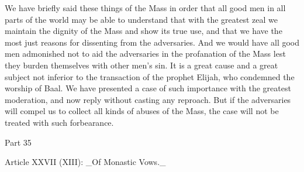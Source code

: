 We have briefly said these things of the Mass in order that all good
men in all parts of the world may be able to understand that with the
greatest zeal we maintain the dignity of the Mass and show its true
use, and that we have the most just reasons for dissenting from the
adversaries.  And we would have all good men admonished not to aid
the adversaries in the profanation of the Mass lest they burden
themselves with other men's sin.  It is a great cause and a great
subject not inferior to the transaction of the prophet Elijah, who
condemned the worship of Baal.  We have presented a case of such
importance with the greatest moderation, and now reply without
casting any reproach.  But if the adversaries will compel us to
collect all kinds of abuses of the Mass, the case will not be treated
with such forbearance.




Part 35


Article XXVII (XIII): _Of Monastic Vows._

